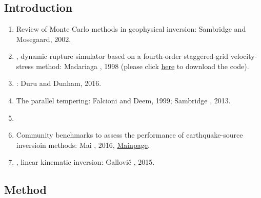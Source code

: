 \renewcommand{\pmk}{Gallovic\_2019\_JGRse\_Bayesian dynamic inversion}
\renewcommand{\prf}{Inversion/\pmk.pdf}
\renewcommand{\pti}{Bayesian dynamic finite-fault inversion:
  1. method and synthetic test}
\renewcommand{\pay}{F. Gallovi\v{c}, \'L. Valentov\'a, J.-P. Ampuero,
  and A.-A. Gabriel, 2019}
\renewcommand{\pjo}{JGR: Solid Earth}
\renewcommand{\pda}{2019/11/20 Wed.}

\section{\pinfo}
\subsection{Introduction}
\begin{enumerate}[\hspace{10mm}*]
  \item Review of Monte Carlo methods in geophysical inversion:
    Sambridge and Mosegaard, 2002.
  \item {}
    ,
    dynamic rupture simulator based on a fourth-order staggered-grid
    velocity-stress method: Madariaga \etal, 1998 (please click
    \href{http://www.geologie.ens.fr/madariag/Programs/programs.html}{here}
    to download the code).
  \item {}
    :
    Duru and Dunham, 2016.
  \item The parallel tempering: Falcioni and Deem, 1999; Sambridge \etal, 2013.
  \item \sline
  \item Community benchmarks to assess the performance of earthquake-source
    inversioin methods: Mai \etal, 2016,
    \href{http://equake-rc.info/SIV}{Mainpage}.
  \item {}
    ,
    linear kinematic inversion: Gallovi\v{c} \etal, 2015.
\end{enumerate}

\subsection{Method}
